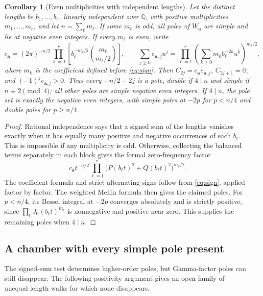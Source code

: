 \documentclass[11pt]{amsart}
\newtheorem{corollary}[thm]{Corollary}
\theoremstyle{definition}
\newcommand{\Q}{\mathbb Q}
\begin{document}
\begin{corollary}[Even multiplicities with independent lengths]
\label{cor:paired-independent}
Let the distinct lengths be $b_1,\ldots,b_r$, linearly independent over
$\Q$, with positive multiplicities $m_1,\ldots,m_r$, and let
$n=\sum_\ell m_\ell$.
If some $m_\ell$ is odd, all poles of $W_{\boldsymbol a}$ are simple
and lie at negative even integers.
If every $m_\ell$ is even, write
\[
 c_{\boldsymbol a}=(2\pi)^{-n/2}
 \prod_{\ell=1}^r\left[ b_\ell^{-m_\ell/2}
 \binom{m_\ell}{m_\ell/2}\right],\qquad
 \sum_{j\ge0}e_{\boldsymbol a,j}u^j
 =\prod_{\ell=1}^r
 \left(\sum_{k\ge0}m_k b_\ell^{-2k}u^k\right)^{m_\ell/2},
\]
where $m_k$ is the coefficient defined before \eqref{eq:sign}.
Then $C_{2j}=c_{\boldsymbol a}e_{\boldsymbol a,j}$,
$C_{2j+1}=0$, and $(-1)^je_{\boldsymbol a,j}>0$.
Thus every $-n/2-2j$ is a pole, double if $4\mid n$ and simple if
$n\equiv2\pmod4$; all other poles are simple negative even integers.
If $4\mid n$, the pole set is exactly the negative even integers, with
simple poles at $-2p$ for $p<n/4$ and double poles for $p\ge n/4$.
\end{corollary}
\begin{proof}
Rational independence says that a signed sum of the lengths vanishes
exactly when it has equally many positive and negative occurrences of
each $b_\ell$. This is impossible if any multiplicity is odd.
Otherwise, collecting the balanced terms separately in each block gives
the formal zero-frequency factor
\[
 c_{\boldsymbol a}t^{-n/2}
 \prod_{\ell=1}^r
 \bigl(P(b_\ell t)^2+Q(b_\ell t)^2\bigr)^{m_\ell/2}.
\]
The coefficient formula and strict alternating signs follow from
\eqref{eq:sign}, applied factor by factor. The weighted Mellin formula
then gives the claimed poles. For $p<n/4$, its Bessel integral at
$-2p$ converges absolutely and is strictly positive, since
$\prod_\ell J_0(b_\ell t)^{m_\ell}$ is nonnegative and positive near
zero. This supplies the remaining poles when $4\mid n$.
\end{proof}

\subsection{A chamber with every simple pole present}

The signed-sum test determines higher-order poles, but Gamma-factor
poles can still disappear. The following positivity argument gives an
open family of unequal-length walks for which none disappears.
\end{document}
